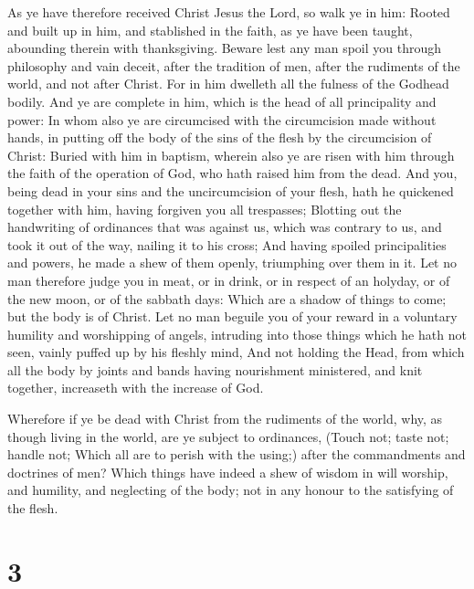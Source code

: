  As ye have therefore received Christ Jesus the Lord, so
walk ye in him:  Rooted and built up in him, and stablished
in the faith, as ye have been taught, abounding therein with
thanksgiving.  Beware lest any man spoil you through
philosophy and vain deceit, after the tradition of men, after the
rudiments of the world, and not after Christ.  For in him
dwelleth all the fulness of the Godhead bodily.  And ye are
complete in him, which is the head of all principality and power:
 In whom also ye are circumcised with the circumcision made
without hands, in putting off the body of the sins of the flesh by the
circumcision of Christ:  Buried with him in baptism,
wherein also ye are risen with him through the faith of the operation of
God, who hath raised him from the dead.  And you, being
dead in your sins and the uncircumcision of your flesh, hath he
quickened together with him, having forgiven you all trespasses;
 Blotting out the handwriting of ordinances that was
against us, which was contrary to us, and took it out of the way,
nailing it to his cross;  And having spoiled principalities
and powers, he made a shew of them openly, triumphing over them in it.
 Let no man therefore judge you in meat, or in drink, or in
respect of an holyday, or of the new moon, or of the sabbath days:
 Which are a shadow of things to come; but the body is of
Christ.  Let no man beguile you of your reward in a
voluntary humility and worshipping of angels, intruding into those
things which he hath not seen, vainly puffed up by his fleshly mind,
 And not holding the Head, from which all the body by
joints and bands having nourishment ministered, and knit together,
increaseth with the increase of God.

 Wherefore if ye be dead with Christ from the rudiments of
the world, why, as though living in the world, are ye subject to
ordinances,  (Touch not; taste not; handle not;
 Which all are to perish with the using;) after the
commandments and doctrines of men?  Which things have
indeed a shew of wisdom in will worship, and humility, and neglecting of
the body; not in any honour to the satisfying of the flesh.

\hypertarget{section-2}{%
\section{3}\label{section-2}}

